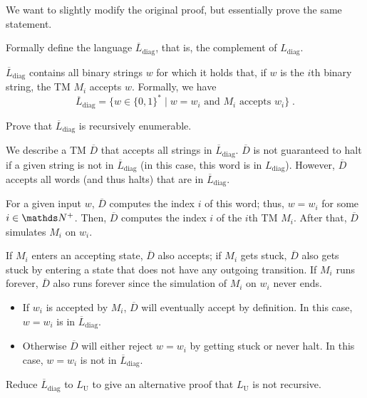 \documentclass{exercise}
\begin{document}
\nosubtask We want to slightly modify the original proof, but essentially prove the same statement.

\subtask Formally define the language $\overline{L}_{\text{diag}}$, that is, the complement of $L_{\text{diag}}$.

  \begin{solution}
    $\overline{L}_{\text{diag}}$ contains all binary strings $w$ for which it holds that, if $w$ is the
    $i$th binary string, the TM $M_i$ accepts $w$.  Formally, we have
    \[ \overline{L}_{\text{diag}} = \{ w\in\{0,1\}^* \mid w = w_{i} \text{ and } M_i \text{ accepts } w_{i} \}\;. \]
  \end{solution}

\subtask Prove that $\overline{L}_{\text{diag}}$ is recursively enumerable.

  \begin{solution}
		We describe a TM $\overline{D}$ that accepts all strings in
		$\overline{L}_{\text{diag}}$.  $\overline{D}$ is not guaranteed to halt if
		a given string is not in $\overline{L}_{\text{diag}}$ (in this case, this
		word is in $L_{\text{diag}}$).  However, $\overline{D}$ accepts all words
		(and thus halts) that are in $\overline{L}_{\text{diag}}$.

		For a given input $w$, $\overline{D}$ computes the index $i$ of this word;
		thus, $w=w_i$ for some $i\in\nat^+$.  Then, $\overline{D}$ computes the
		index $i$ of the $i$th TM $M_i$.  After that, $\overline{D}$ simulates $M_i$
    on $w_i$.

    If $M_i$ enters an accepting state, $\overline{D}$ also accepts; if $M_i$ gets
    stuck, $\overline{D}$ also gets stuck by entering a state that does not have any outgoing
    transition.  If $M_i$ runs forever, $\overline{D}$ also runs forever since the simulation
    of $M_i$ on $w_i$ never ends.

    \begin{itemize}
      \item If $w_i$ is accepted by $M_i$, $\overline{D}$ will eventually accept by definition.
        In this case, $w=w_i$ is in $\overline{L}_{\text{diag}}$.
      \item Otherwise $\overline{D}$ will either reject $w=w_i$ by getting stuck or never halt.
        In this case, $w=w_i$ is not in $\overline{L}_{\text{diag}}$.
    \end{itemize}
  \end{solution}

\subtask Reduce $\overline{L}_{\text{diag}}$ to $L_{\text{U}}$ to give an alternative proof
  that $L_{\text{U}}$ is not recursive.
\end{document}
